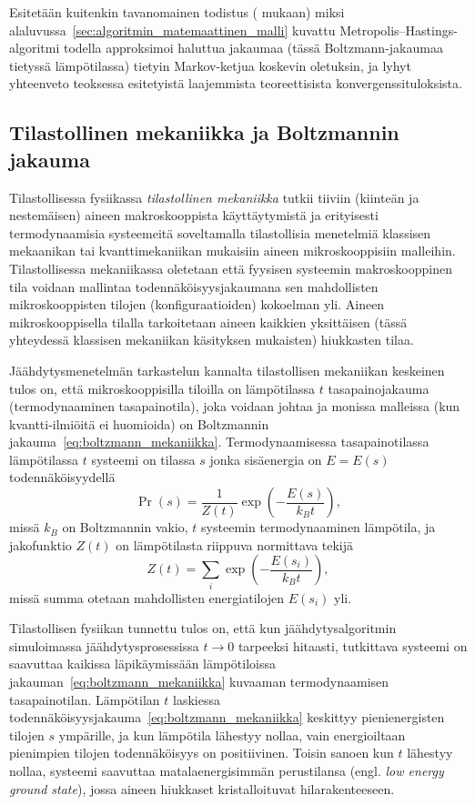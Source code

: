 Esitetään kuitenkin tavanomainen todistus (\cite{chib95} mukaan) miksi alaluvussa~\ref{sec:algoritmin_matemaattinen_malli} kuvattu Metropolis--Hastings-algoritmi todella approksimoi haluttua jakaumaa (tässä Boltzmann-jakaumaa tietyssä lämpötilassa) tietyin Markov-ketjua koskevin oletuksin,
ja lyhyt yhteenveto teoksessa \cite{laarhoven} esitetyistä laajemmista teoreettisista konvergenssituloksista.

\subsection{Tilastollinen mekaniikka ja Boltzmannin jakauma}
\label{sub:tilastollinen_mekaniikka}

Tilastollisessa fysiikassa \emph{tilastollinen mekaniikka} tutkii tiiviin (kiinteän ja nestemäisen) aineen makroskooppista käyttäytymistä ja erityisesti termodynaamisia systeemeitä soveltamalla tilastollisia menetelmiä klassisen mekaanikan tai kvanttimekaniikan mukaisiin aineen mikroskooppisiin malleihin.
Tilastollisessa mekaniikassa oletetaan että fyysisen systeemin makroskooppinen tila voidaan mallintaa todennäköisyysjakaumana sen mahdollisten mikroskooppisten tilojen (konfiguraatioiden) kokoelman yli.
Aineen mikroskooppisella tilalla tarkoitetaan aineen kaikkien yksittäisen (tässä yhteydessä klassisen mekaniikan käsityksen mukaisten) hiukkasten tilaa.~\cite{salamonetal}

Jäähdytysmenetelmän tarkastelun kannalta tilastollisen mekaniikan keskeinen tulos on,
että mikroskooppisilla tiloilla on lämpötilassa $t$ tasapainojakauma (termodynaaminen tasapainotila),
joka voidaan johtaa \cite[ks. esim.][luku 5]{salamonetal} ja monissa malleissa (kun kvantti-ilmiöitä ei huomioida) on Boltzmannin jakauma~\eqref{eq:boltzmann_mekaniikka}.
Termodynaamisessa tasapainotilassa lämpötilassa $t$ systeemi on tilassa $s$ jonka sisäenergia on $E = E(s)$ todennäköisyydellä
\begin{equation}
    \label{eq:boltzmann_mekaniikka}
    \Pr\left(s\right) = \frac{1}{Z(t)} \exp \left(-\frac{E(s)}{k_B t}\right),
\end{equation}
missä $k_B$ on Boltzmannin vakio, $t$ systeemin termodynaaminen lämpötila,
ja jakofunktio $Z(t)$ on lämpötilasta riippuva normittava tekijä
\begin{equation}
    Z(t) = \sum_{i} \exp \left(-\frac{E(s_i)}{k_Bt}\right),
\end{equation}
missä summa otetaan mahdollisten energiatilojen $E(s_i)$ yli.

Tilastollisen fysiikan tunnettu tulos on, että kun jäähdytysalgoritmin simuloimassa jäähdytysprosessissa $t \to 0$ tarpeeksi hitaasti,
tutkittava systeemi on saavuttaa kaikissa läpikäymissään lämpötiloissa jakauman~\ref{eq:boltzmann_mekaniikka} kuvaaman termodynaamisen tasapainotilan.
Lämpötilan $t$ laskiessa todennäköisyysjakauma~\ref{eq:boltzmann_mekaniikka} keskittyy pienienergisten tilojen $s$ ympärille,
ja kun lämpötila lähestyy nollaa, vain energioiltaan pienimpien tilojen todennäköisyys on positiivinen.
Toisin sanoen kun $t$ lähestyy nollaa, systeemi saavuttaa matalaenergisimmän perustilansa (engl. \emph{low energy ground state}),
jossa aineen hiukkaset kristalloituvat hilarakenteeseen.

